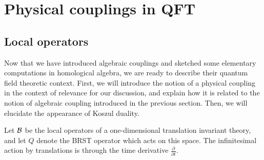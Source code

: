 \documentclass[11pt]{amsart}
\begin{document}
%

\section{Physical couplings in QFT}\label{s:lagcoupling}


\subsection{Local operators}

Now that we have introduced algebraic couplings and sketched some elementary computations in homological algebra, we are ready to describe their quantum field theoretic context. First, we will introduce the notion of a physical coupling in the context of relevance for our discussion, and explain how it is related to the notion of algebraic coupling introduced in the previous section. Then, we will elucidate the appearance of Koszul duality. 

Let $\mathcal B$ be the local operators of a one-dimensional translation invariant theory, and let $Q$ denote the BRST operator which acts on this space. 
The infinitesimal action by translations is through the time derivative $\frac{\partial}{\partial t}$. 
\end{document}
